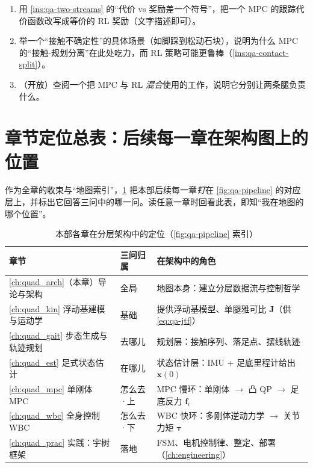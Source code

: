 \begin{practice}
\begin{enumerate}
  \item 用 \cref{ins:qa-two-streams} 的“代价 vs 奖励差一个符号”，把一个 MPC 的跟踪代价函数改写成等价的 RL 奖励（文字描述即可）。
  \item 举一个“接触不确定性”的具体场景（如脚踩到松动石块），说明为什么 MPC 的“接触-规划分离”在此处吃力，而 RL 策略可能更鲁棒（\cref{ins:qa-contact-split}）。
  \item （开放）查阅一个把 MPC 与 RL \emph{混合}使用的工作，说明它分别让两条腿负责什么。
\end{enumerate}
\end{practice}

\section{章节定位总表：后续每一章在架构图上的位置}
\label{sec:qa-map}

作为全章的收束与“地图索引”，\cref{tab:qa-chapter-map} 把本部后续每一章\emph{钉}在 \cref{fig:qa-pipeline} 的对应层上，并标出它回答三问中的哪一问。读任意一章时回看此表，即知“我在地图的哪个位置”。

\begin{table}[H]\centering\small
\caption{本部各章在分层架构中的定位（\cref{fig:qa-pipeline} 索引）}
\begin{tabular}{p{} p{} p{}}
\toprule
章节 & 三问归属 & 在架构中的角色 \\
\midrule
\cref{ch:quad_arch}（本章）导论与架构 & 全局 & 地图本身：建立分层数据流与控制哲学 \\
\cref{ch:quad_kin} 浮动基建模与运动学 & 基础 & 提供浮动基模型、单腿雅可比 $\mathbf{J}$（供 \cref{eq:qa-jtf}）\\
\cref{ch:quad_gait} 步态生成与轨迹规划 & 去哪儿 & 规划层：接触序列、落足点、摆线轨迹 \\
\cref{ch:quad_est} 足式状态估计 & 在哪儿 & 状态估计层：IMU + 足底里程计给出 $\boldsymbol x(0)$ \\
\cref{ch:quad_mpc} 单刚体 MPC & 怎么去·上 & MPC 慢环：单刚体 $\to$ 凸 QP $\to$ 足底反力 $\mathbf{f}_i$ \\
\cref{ch:quad_wbc} 全身控制 WBC & 怎么去·下 & WBC 快环：多刚体逆动力学 $\to$ 关节力矩 $\boldsymbol\tau$ \\
\cref{ch:quad_prac} 实践：宇树框架 & 落地 & FSM、电机控制律、整定、部署（\cref{ch:engineering}）\\
\bottomrule
\end{tabular}
\label{tab:qa-chapter-map}
\end{table}

